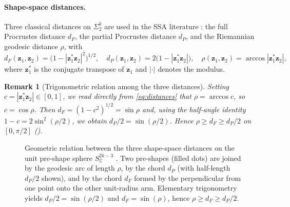 \documentclass[review,11pt,3p,authoryear]{elsarticle}
\newtheorem{remark}{Remark}[section]
\newcommand{\C}{\mathbb{C}}
\newcommand{\Herm}[1]{{#1}^{*}}
\newcommand{\preshape}{S^{2k-3}_{\C}}
\newcommand{\bz}{\mathbf{z}}
\begin{document}
\paragraph{Shape-space distances.}
Three classical distances on $\Sigma_2^k$ are used in the SSA literature
\citep{dryden2016statistical}: the full Procrustes distance $d_F$, the
partial Procrustes distance $d_P$, and the Riemannian geodesic distance
$\rho$, with
\begin{equation}
  \label{eq:distances}
  d_F(\bz_1,\bz_2) = \bigl(1-|\Herm{\bz}_1\bz_2|^2\bigr)^{1/2},\quad
  d_P(\bz_1,\bz_2) = 2\bigl(1-|\Herm{\bz}_1\bz_2|\bigr),\quad
  \rho(\bz_1,\bz_2) = \arccos|\Herm{\bz}_1\bz_2|,
\end{equation}
where $\Herm{\bz}_1$ is the conjugate transpose of $\bz_1$ and
$|\cdot|$ denotes the modulus.

\begin{remark}[Trigonometric relation among the three distances]
\label{rem:trig}
Setting $c = |\Herm{\bz}_1\bz_2|\in[0,1]$, we read directly from
\eqref{eq:distances} that $\rho=\arccos c$, so $c=\cos\rho$. Then
$d_F = (1-c^2)^{1/2} = \sin\rho$ and, using the half-angle identity
$1-c = 2\sin^2(\rho/2)$, we obtain $d_P/2 = \sin(\rho/2)$. Hence
$\rho \ge d_F \ge d_P/2$ on $[0,\pi/2]$ ().
\end{remark}

\begin{figure}[!htbp]
\centering
{}
\caption{Geometric relation between the three shape-space distances on
  the unit pre-shape sphere $\preshape$ \citep{dryden2016statistical}.
  Two pre-shapes (filled dots) are joined by the geodesic arc of length
  $\rho$, by the chord $d_P$ (with half-length $d_P/2$ shown), and by
  the chord $d_F$ formed by the perpendicular from one point onto the
  other unit-radius arm. Elementary trigonometry yields
  $d_P/2 = \sin(\rho/2)$ and $d_F = \sin(\rho)$, hence
  $\rho \ge d_F \ge d_P/2$.}
\label{fig:preshape}
\end{figure}
\end{document}
